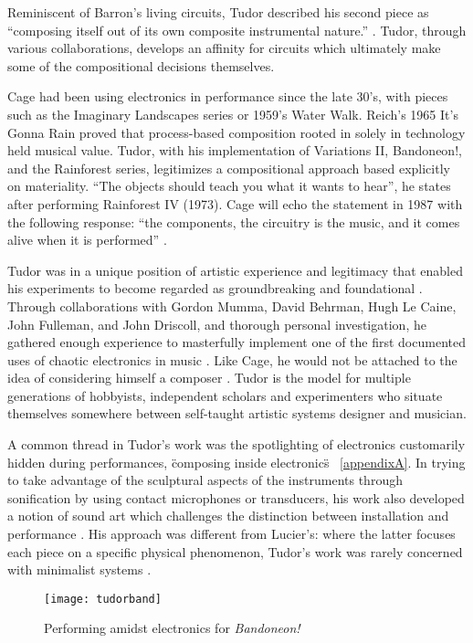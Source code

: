 \begin{itemize}
Reminiscent of Barron’s living circuits, Tudor described his second piece as “composing itself out of its own composite instrumental nature.”  \citep{tudor,kuivila2004}. Tudor, through various collaborations, develops an affinity for circuits which ultimately make some of the compositional decisions themselves. 

Cage had been using electronics in performance since the late 30’s, with pieces such as the Imaginary Landscapes series or 1959’s Water Walk. Reich’s 1965 It’s Gonna Rain proved that process-based composition rooted in solely in technology held musical value. Tudor, with his implementation of Variations II, Bandoneon!, and the Rainforest series, legitimizes a compositional approach based explicitly on materiality. “The objects should teach you what it wants to hear”, he states after performing Rainforest IV (1973). Cage will echo the statement in 1987 with the following response: “the components, the circuitry is the music, and it comes alive when it is performed” \citep{nakai2014}. 

Tudor was in a unique position of artistic experience and legitimacy that enabled his experiments to become regarded as groundbreaking and foundational \citep{collins2004}. Through collaborations with Gordon Mumma, David Behrman, Hugh Le Caine, John Fulleman, and John Driscoll, and thorough personal investigation, he gathered enough experience to masterfully implement one of the first documented uses of chaotic electronics in music \citep{kuivila2004}.  Like Cage, he would not be attached to the idea of considering himself a composer \citep{kuivila1998}. Tudor is the model for multiple generations of hobbyists, independent scholars and experimenters who situate themselves somewhere between self-taught artistic systems designer and musician. 

A common thread in Tudor’s work was the spotlighting of electronics customarily hidden during performances, \"composing inside electronics\" ~\ref{appendixA}. In trying to take advantage of the sculptural aspects of the instruments through sonification by using contact microphones or transducers, his work also developed a notion of sound art which challenges the distinction between installation and performance \citep{driscoll2004}. His approach was different from Lucier’s: where the latter focuses each piece on a specific physical phenomenon, Tudor’s work was rarely concerned with minimalist systems \citep{collins2004,driscoll2004}. 

	\begin{figure}[h!]
	  \caption{Performing amidst electronics for \emph{Bandoneon!}}
	  \centering
	    \texttt{[image: tudorband]}
	\end{figure}


\end{itemize}
